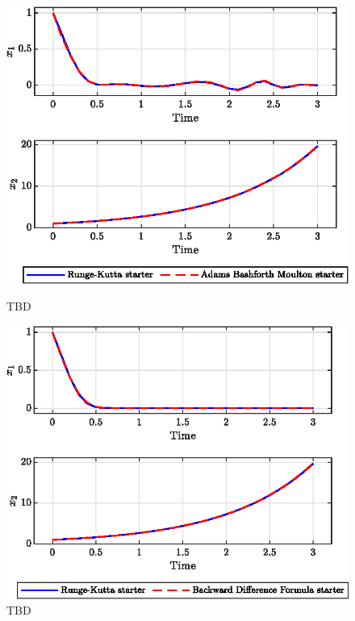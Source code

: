 \documentclass[11pt,a4paper,oneside]{article}
\begin{document}
\begin{figure}[htb]
    \centering
    \begin{minipage}{0.45\textwidth}
        \centering
        \includegraphics*[width=\textwidth, keepaspectratio]{ex7_abm.eps}
        \caption[]{\label{fig:ex7_abm} TBD}
    \end{minipage}
    \hspace{0.05\textwidth}
    \begin{minipage}{0.45\textwidth}
        \centering
        \includegraphics*[width=\textwidth, keepaspectratio]{ex7_bdf.eps}
        \caption[]{\label{fig:ex7_bdf} TBD}
    \end{minipage}
\end{figure}
\end{document}
